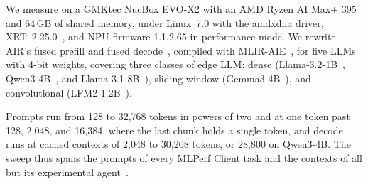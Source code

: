We measure on a GMKtec NucBox EVO-X2 with an AMD Ryzen\texttrademark{} AI Max+ 395 and 64\,GB of shared memory, under Linux~7.0 with the amdxdna driver, XRT~2.25.0~\citep{xdna-driver,xrt-repo}, and NPU firmware 1.1.2.65 in performance mode.
We rewrite AIR's fused prefill and fused decode~\citep{wang2026mlirair}, compiled with MLIR-AIE~\citep{mlir-aie-repo}, for five LLMs with 4-bit weights, covering three classes of edge LLM: dense (Llama-3.2-1B~\citep{meta2024llama32}, Qwen3-4B~\citep{qwen2025qwen3}, and Llama-3.1-8B~\citep{meta2024llama31}), sliding-window (Gemma3-4B~\citep{farabet2025gemma3}), and convolutional (LFM2-1.2B~\citep{liquidai2025lfm2}).

Prompts run from 128 to 32{,}768 tokens in powers of two and at one token past 128, 2{,}048, and 16{,}384, where the last chunk holds a single token, and decode runs at cached contexts of 2{,}048 to 30{,}208 tokens, or 28{,}800 on Qwen3-4B.
The sweep thus spans the prompts of every MLPerf Client task and the contexts of all but its experimental agent~\citep{mlcommons2026mlperfclient}.

